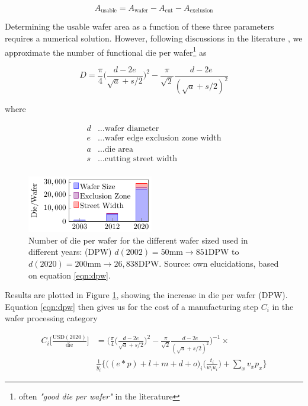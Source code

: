 \documentclass[10pt]{article}
\begin{document}
\begin{equation}
	A_{\text{usable}}=A_{\text{wafer}}-A_{\text{cut}}-A_{\text{exclusion}}
\end{equation}

Determining the usable wafer area as a function of these three parameters requires a numerical solution. However, following discussions in the literature \cite{de2005investigation}, we approximate the number of functional die per wafer\footnote{often \textit{"good die per wafer"} in the literature} as

\begin{equation}
\label{eqn:dpw}
	D=\frac{\pi}{4}  \bigg ( \frac{d-2e}{\sqrt{a}+s/2} \bigg ) ^2 - \frac{\pi}{\sqrt{2}}\frac{d-2e}{(\sqrt{a}+s/2)^2}
\end{equation}

where

\begin{align*}
    d &\dots \text{wafer diameter} \\
    e &\dots \text{wafer edge exclusion zone width} \\
    a &\dots \text{die area} \\
    s &\dots \text{cutting street width} \\
\end{align*}

\begin{figure}[h!]
    \centering
    \includegraphics[width=5.5cm]{./figures/die-per-wafer.pdf}
    \caption{Number of die per wafer for the different wafer sized used in different years: (DPW) $d(2002)=50$mm$\rightarrow851$DPW to $d(2020)=200$mm$\rightarrow26,838$DPW. Source: own elucidations, based on equation \cref{eqn:dpw}.}
    \label{fig:dpw}
\end{figure}

Results are plotted in Figure \cref{fig:dpw}, showing the increase in die per wafer (DPW). Equation \cref{eqn:dpw} then gives us for the cost of a manufacturing step $C_i$ in the wafer processing category

\begin{equation}
\label{eqn:cost_wafer_full}
\begin{split}
    C_i \bigg[ \frac{ \text{USD}(2020) }{ \text{die} } \bigg] &= \bigg (  \frac{\pi}{4}  \bigg ( \frac{d-2e}{\sqrt{a}+s/2} \bigg ) ^2 - \frac{\pi}{\sqrt{2}}\frac{d-2e}{(\sqrt{a}+s/2)^2} \bigg )^{-1} \times \\
    &  \frac{1}{y_i}  \bigg\{ \bigg((e*p) + l + m + d +o \bigg)_i \bigg( \frac{t_i}{w_i u_i} \bigg) + \sum_{x} v_x p_x \bigg\}
\end{split}
\end{equation}
\end{document}
